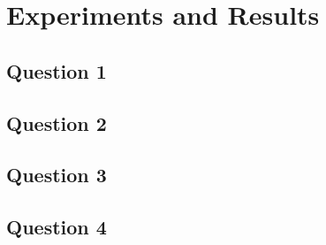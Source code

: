 \chapter{Experiments and Results}

\section{Question 1}
\section{Question 2}
\section{Question 3}
\section{Question 4}
